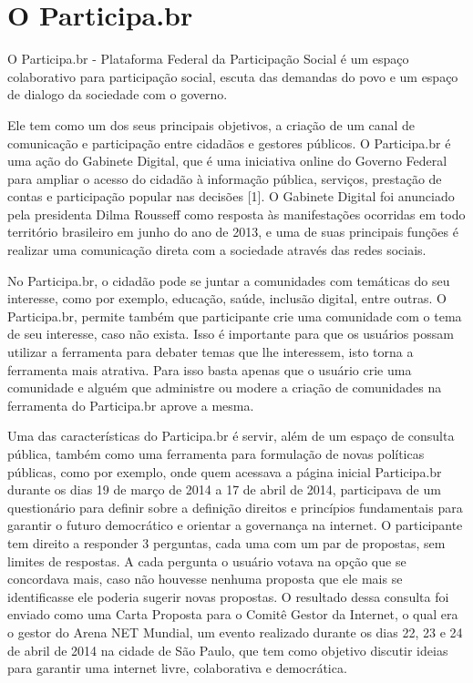 \chapter{O Participa.br}

O Participa.br - Plataforma Federal da Participação Social é um espaço colaborativo  	para participação social, escuta das demandas do povo e um espaço de dialogo da sociedade com o governo.

%

Ele tem como um dos seus principais objetivos, a criação de um canal de comunicação e participação entre cidadãos e gestores públicos. O Participa.br é uma ação do Gabinete Digital, que é uma iniciativa online do Governo Federal para ampliar o acesso do cidadão à informação pública, serviços, prestação de contas e participação popular nas decisões [1]. O Gabinete Digital foi anunciado pela presidenta Dilma Rousseff como resposta às manifestações ocorridas em todo território brasileiro em junho do ano de 2013, e uma de suas principais funções é realizar uma comunicação direta com a sociedade através das redes sociais.

%

No Participa.br, o cidadão pode se juntar a comunidades com temáticas do seu interesse, como por exemplo, educação, saúde, inclusão digital, entre outras. O Participa.br, permite também que participante crie uma comunidade com o tema de seu interesse, caso não exista. Isso é importante para que os usuários possam utilizar a ferramenta para debater temas que lhe interessem, isto torna a ferramenta mais atrativa. Para isso basta apenas que o usuário crie uma comunidade e alguém que administre ou modere a criação de comunidades na ferramenta do Participa.br aprove a mesma.

%

Uma das características do Participa.br é servir, além de um espaço de consulta pública, também como uma ferramenta para formulação de novas políticas públicas, como por exemplo, onde quem acessava a página inicial Participa.br durante os dias 19 de março de 2014 a 17 de abril de 2014, participava de um questionário para definir sobre a definição direitos e princípios fundamentais para garantir o futuro democrático e orientar a governança na internet. O participante tem direito a responder 3 perguntas, cada uma com um par de propostas, sem limites de respostas. A cada pergunta o usuário votava na opção que se concordava mais, caso não houvesse nenhuma proposta que ele mais se identificasse ele poderia sugerir novas propostas. O resultado dessa consulta foi enviado como uma Carta Proposta para o Comitê Gestor da Internet, o qual era o gestor do Arena NET Mundial, um evento realizado durante os dias 22, 23 e 24 de abril de 2014 na cidade de São Paulo, que tem como objetivo discutir ideias para garantir uma internet livre, colaborativa e democrática.

